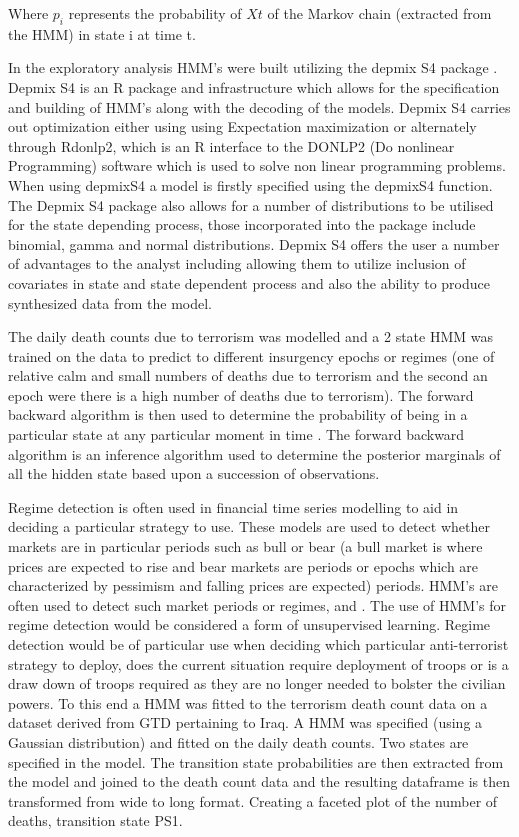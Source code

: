 Where $p_i$ represents the probability of $Xt$ of the Markov chain (extracted from the HMM) in state i at time t.

In the exploratory analysis HMM's were built utilizing the depmix S4 package \citep{visser2012package}. Depmix S4  is an R package and infrastructure which allows for the specification and building of HMM's along with the decoding of the models. Depmix S4 carries out  optimization either using using Expectation maximization or alternately through Rdonlp2, which is an R interface to the DONLP2 (Do nonlinear Programming) \citep{spelluccidonlp} software which is used to solve non linear programming problems. When using depmixS4 a model is firstly specified using the depmixS4 function. The Depmix S4 package also allows for a number of distributions to be utilised for the state depending process, those incorporated into the package include binomial, gamma and normal distributions. Depmix S4 offers the user a number of advantages to the analyst including allowing them to utilize inclusion of covariates in state and state dependent process and also the ability to produce synthesized data from the model.

The daily death counts due to terrorism was modelled and a 2 state HMM was trained on the data to predict to different insurgency epochs or regimes (one of relative calm and small numbers of deaths due to terrorism and the second an epoch were there is a high number of deaths due to terrorism). The forward backward algorithm is then used to determine the probability of being in a particular state at any particular moment in time \citep{austin1991forward}. The forward backward algorithm  is an inference algorithm used to determine the posterior marginals of all the hidden state based upon a succession of observations. 

Regime detection is often used in financial time series modelling to aid in deciding a particular strategy to use. These models are used  to detect whether markets are in particular periods such as bull or bear (a bull market is where prices are expected to rise and bear markets are periods or epochs which are characterized by pessimism and falling prices are expected) periods. HMM’s are often used to detect such market periods or regimes, \citep{RegimeDetection2012} and \citep{bae2014dynamic}. The use of HMM's for regime detection would be considered a form of unsupervised learning. Regime detection would be of particular use when deciding which particular anti-terrorist strategy to deploy, does the current situation require deployment of troops or is a draw down of troops required as they are no longer needed to bolster the civilian powers. To this end a HMM was fitted to the terrorism death count data on a dataset derived from GTD pertaining to Iraq. A HMM was specified (using a Gaussian distribution) and fitted on the daily death counts. Two states are specified in the model. The transition state probabilities are then extracted from the model and joined to the death count data and the resulting dataframe is then transformed from wide to long format. Creating a faceted plot of the number of deaths, transition state PS1. 

